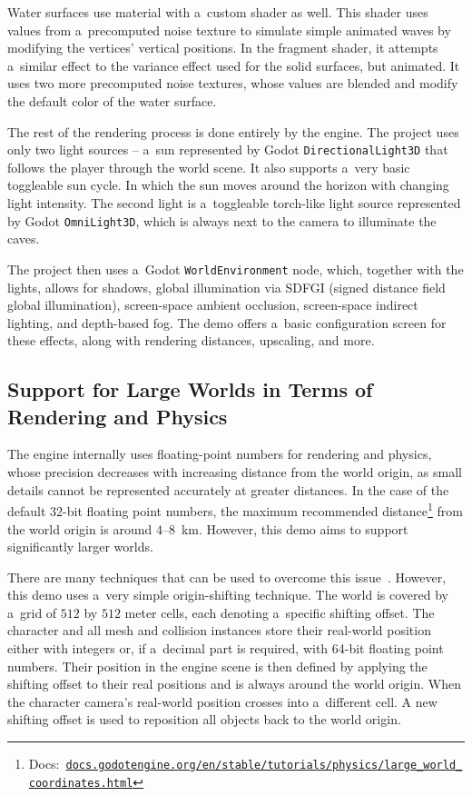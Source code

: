 Water surfaces use material with a~custom shader as well. This shader uses values from a~precomputed noise texture to simulate simple animated waves by modifying the vertices' vertical positions. In the fragment shader, it attempts a~similar effect to the variance effect used for the solid surfaces, but animated. It uses two more precomputed noise textures, whose values are blended and modify the default color of the water surface.

The rest of the rendering process is done entirely by the engine. The project uses only two light sources -- a~sun represented by Godot \texttt{DirectionalLight3D} that follows the player through the world scene. It also supports a~very basic toggleable sun cycle. In which the sun moves around the horizon with changing light intensity. The second light is a~toggleable torch-like light source represented by Godot \texttt{OmniLight3D}, which is always next to the camera to illuminate the caves.

The project then uses a~Godot \texttt{WorldEnvironment} node, which, together with the lights, allows for shadows, global illumination via SDFGI (signed distance field global illumination), screen-space ambient occlusion, screen-space indirect lighting, and depth-based fog. The demo offers a~basic configuration screen for these effects, along with rendering distances, upscaling, and more.

\subsection{Support for Large Worlds in Terms of Rendering and Physics}

The engine internally uses floating-point numbers for rendering and physics, whose precision decreases with increasing distance from the world origin, as small details cannot be represented accurately at greater distances. In the case of the default 32-bit floating point numbers, the maximum recommended distance\footnote{Docs:~\href{https://docs.godotengine.org/en/stable/tutorials/physics/large_world_coordinates.html}{\texttt{docs.godotengine.org/en/stable/tutorials/physics/large\_world\_coordinates.html}}} from the world origin is around $4$--$8$~km. However, this demo aims to support significantly larger worlds.

There are many techniques that can be used to overcome this issue~\cite{large_world_support}. However, this demo uses a~very simple origin-shifting technique. The world is covered by a~grid of $512$ by $512$ meter cells, each denoting a~specific shifting offset. The character and all mesh and collision instances store their real-world position either with integers or, if a~decimal part is required, with 64-bit floating point numbers. Their position in the engine scene is then defined by applying the shifting offset to their real positions and is always around the world origin. When the character camera's real-world position crosses into a~different cell. A new shifting offset is used to reposition all objects back to the world origin.


